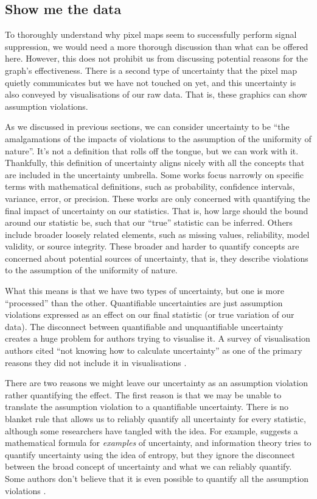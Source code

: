 \documentclass[
  12pt]{article}
\begin{document}
\subsection{Show me the data}\label{show-me-the-data}

To thoroughly understand why pixel maps seem to successfully perform
signal suppression, we would need a more thorough discussion than what
can be offered here. However, this does not prohibit us from discussing
potential reasons for the graph's effectiveness. There is a second type
of uncertainty that the pixel map quietly communicates but we have not
touched on yet, and this uncertainty is also conveyed by visualisations
of our raw data. That is, these graphics can show assumption violations.

As we discussed in previous sections, we can consider uncertainty to be
``the amalgamations of the impacts of violations to the assumption of
the uniformity of nature''. It's not a definition that rolls off the
tongue, but we can work with it. Thankfully, this definition of
uncertainty aligns nicely with all the concepts that are included in the
uncertainty umbrella. Some works
\citep{Hullman2018, Maceachren2012, Thomson2005} focus narrowly on
specific terms with mathematical definitions, such as probability,
confidence intervals, variance, error, or precision. These works are
only concerned with quantifying the final impact of uncertainty on our
statistics. That is, how large should the bound around our statistic be,
such that our ``true'' statistic can be inferred. Others
\citep{Griethe2006, Leland2005, Pang1997, Pham2009, Boukhelifa2017}
include broader loosely related elements, such as missing values,
reliability, model validity, or source integrity. These broader and
harder to quantify concepts are concerned about potential sources of
uncertainty, that is, they describe violations to the assumption of the
uniformity of nature.

What this means is that we have two types of uncertainty, but one is
more ``processed'' than the other. Quantifiable uncertainties are just
assumption violations expressed as an effect on our final statistic (or
true variation of our data). The disconnect between quantifiable and
unquantifiable uncertainty creates a huge problem for authors trying to
visualise it. A survey of visualisation authors cited ``not knowing how
to calculate uncertainty'' as one of the primary reasons they did not
include it in visualisations \citep{Hullman2020a}.

There are two reasons we might leave our uncertainty as an assumption
violation rather quantifying the effect. The first reason is that we may
be unable to translate the assumption violation to a quantifiable
uncertainty. There is no blanket rule that allows us to reliably
quantify all uncertainty for every statistic, although some researchers
have tangled with the idea. For example, \citet{Thomson2005} suggests a
mathematical formula for \emph{examples} of uncertainty, and information
theory tries to quantify uncertainty using the idea of entropy, but they
ignore the disconnect between the broad concept of uncertainty and what
we can reliably quantify. Some authors don't believe that it is even
possible to quantify all the assumption violations
\citep{Spiegelhalter2017}.
\end{document}
